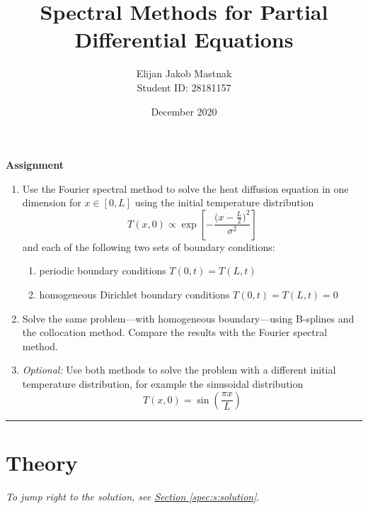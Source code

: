 \documentclass[11pt, a4paper]{article}
\begin{document}
\title{Spectral Methods for Partial Differential Equations}
\author{Elijan Jakob Mastnak\\[1mm]\small{Student ID: 28181157}}
\date{December 2020}
\maketitle

\tableofcontents

\newpage
\begin{center}
\textbf{Assignment}
\begin{enumerate}
	\item Use the Fourier spectral method to solve the heat diffusion equation in one dimension for $ x \in [0, L] $ using the initial temperature distribution
	\begin{equation*}
		T(x, 0) \propto \exp\left[-\frac{\big(x - \frac{L}{2}\big)^{2}}{\sigma^{2}}\right]
	\end{equation*}
	and each of the following two sets of boundary conditions:
	\begin{enumerate}
		\item periodic boundary conditions $ T(0, t) = T(L, t)$
		\item homogeneous Dirichlet boundary conditions $ T(0, t) = T(L, t) = 0 $
	\end{enumerate}
	
	\item Solve the same problem---with homogeneous boundary---using B-splines and the collocation method. Compare the results with the Fourier spectral method.
	
	\item \textit{Optional:} Use both methods to solve the problem with a different initial temperature distribution, for example the sinusoidal distribution
	\begin{equation*}
		T(x, 0) = \sin(\frac{\pi x}{L})
	\end{equation*}
\end{enumerate}
\end{center}

\vspace{2mm}

\rule{\textwidth}{0.2pt}

\section{Theory} \label{spec:s:theory}
\vspace{-2mm}
\textit{To jump right to the solution, see \hyperref[spec:s:solution]{Section \ref{spec:s:solution}}}.
\end{document}
